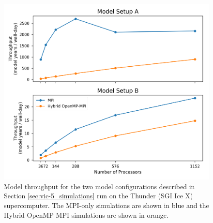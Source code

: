 \documentclass[gmd, manuscript]{copernicus}
\begin{document}
\clearpage
\begin{figure}[t]
\includegraphics[width=6in]{VIC_scaling.png}
\caption{Model throughput for the two model configurations described in Section \ref{sec:vic-5_simulations} run on the Thunder (SGI Ice X) supercomputer. The MPI-only simulations are shown in blue and the Hybrid OpenMP-MPI simulations are shown in orange.}
\label{fig:vic_scaling}
\end{figure}


\end{document}
